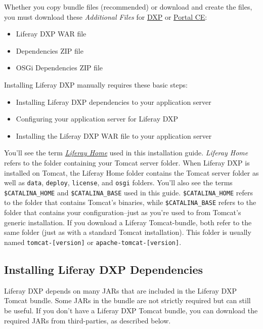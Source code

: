 Whether you copy bundle files (recommended) or download and create the
files, you must download these \emph{Additional Files} for
\href{https://help.liferay.com/hc}{DXP} or
\href{https://www.liferay.com/downloads-community}{Portal CE}:

\begin{itemize}
\tightlist
\item
  Liferay DXP WAR file
\item
  Dependencies ZIP file
\item
  OSGi Dependencies ZIP file
\end{itemize}

Installing Liferay DXP manually requires these basic steps:

\begin{itemize}
\tightlist
\item
  Installing Liferay DXP dependencies to your application server
\item
  Configuring your application server for Liferay DXP
\item
  Installing the Liferay DXP WAR file to your application server
\end{itemize}

You'll see the term
\href{/docs/7-0/deploy/-/knowledge_base/d/installing-product\#liferay-home}{\emph{Liferay
Home}} used in this installation guide. \emph{Liferay Home} refers to
the folder containing your Tomcat server folder. When Liferay DXP is
installed on Tomcat, the Liferay Home folder contains the Tomcat server
folder as well as \texttt{data}, \texttt{deploy}, \texttt{license}, and
\texttt{osgi} folders. You'll also see the terms
\texttt{\$CATALINA\_HOME} and \texttt{\$CATALINA\_BASE} used in this
guide. \texttt{\$CATALINA\_HOME} refers to the folder that contains
Tomcat's binaries, while \texttt{\$CATALINA\_BASE} refers to the folder
that contains your configuration--just as you're used to from Tomcat's
generic installation. If you download a Liferay Tomcat-bundle, both
refer to the same folder (just as with a standard Tomcat installation).
This folder is usually named \texttt{tomcat-{[}version{]}} or
\texttt{apache-tomcat-{[}version{]}}.

\subsection{Installing Liferay DXP
Dependencies}\label{installing-liferay-dxp-dependencies}

Liferay DXP depends on many JARs that are included in the Liferay DXP
Tomcat bundle. Some JARs in the bundle are not strictly required but can
still be useful. If you don't have a Liferay DXP Tomcat bundle, you can
download the required JARs from third-parties, as described below.

